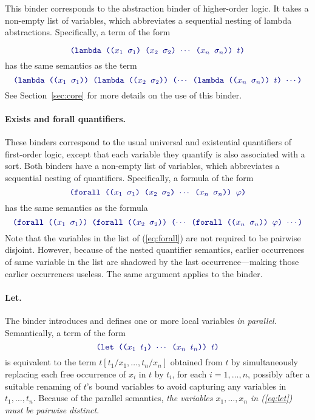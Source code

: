 This binder corresponds to the abstraction binder of higher-order logic.
It takes a non-empty list of variables, 
which abbreviates a sequential nesting of lambda abstractions.
Specifically, a term of the form

\begin{equation} \label{eq:lambda}
  \expr{
  (lambda (($x_1$ $\sigma_1$) ($x_2$ $\sigma_2$) $\cdots$ ($x_n$ $\sigma_n$)) 
    $t$)
  }
\end{equation}
has the same semantics as the term
%
  \begin{equation} \label{eq:nested-lambda}
  \expr{
   (lambda (($x_1$ $\sigma_1$)) 
   (lambda (($x_2$ $\sigma_2$)) ($\cdots$ 
   (lambda (($x_n$ $\sigma_n$)) $t$) $\cdots$)
  }
  \end{equation}
  See Section~\ref{sec:core} for more details on the use of this binder.

\paragraph{Exists and forall quantifiers.}
These binders correspond 
to the usual universal and existential quantifiers of first-order logic,
except that each variable they quantify is also associated with a sort.
Both binders have a non-empty list of variables, 
which abbreviates a sequential nesting of quantifiers.
Specifically, a formula of the form
%
\begin{equation} \label{eq:forall}
\expr{
(forall (($x_1$ $\sigma_1$) ($x_2$ $\sigma_2$) $\cdots$ ($x_n$ $\sigma_n$)) 
  $\varphi$)
}
\end{equation}
%
has the same semantics as the formula
%
\begin{equation} \label{eq:nested-forall}
\expr{
 (forall (($x_1$ $\sigma_1$)) 
 (forall (($x_2$ $\sigma_2$)) ($\cdots$ 
 (forall (($x_n$ $\sigma_n$)) $\varphi$) $\cdots$)
}
\end{equation}
%
Note that the variables in the list 
of (\ref{eq:forall}) are not required to be pairwise disjoint.
However, because of the nested quantifier semantics, earlier occurrences 
of same variable in the list are shadowed by the last occurrence---making 
those earlier occurrences useless.
The same argument applies to the  binder.

\paragraph{Let.}
The  binder introduces and defines 
one or more local variables \emph{in parallel}.
Semantically, a term of the form
%
\begin{equation} \label{eq:let}
\expr{(let (($x_1$ $t_1$) $\cdots$ ($x_n$ $t_n$)) $t$)}
\end{equation}
%
is equivalent to the term $t[t_1/x_1, \ldots, t_n/x_n]$ obtained from $t$ 
by simultaneously replacing each free occurrence of $x_i$ in $t$ by $t_i$, 
for each $i=1,\ldots,n$,
possibly after a suitable renaming of $t$'s bound variables 
to avoid capturing any variables in $t_1, \ldots, t_n$.
Because of the parallel semantics, 
\emph{the variables $x_1, \ldots, x_n$ in (\ref{eq:let}) must be pairwise distinct}.

